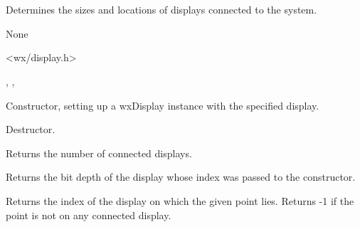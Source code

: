 \section{}\label{wxdisplay}

Determines the sizes and locations of displays connected to the system.


None


<wx/display.h>


, , 


\label{wxdisplayconstr}


Constructor, setting up a wxDisplay instance with the specified display.





Destructor.

\label{wxdisplaygetcount}


Returns the number of connected displays.

\label{wxdisplaygetdepth}


Returns the bit depth of the display whose index was passed to the constructor.

\label{wxdisplaygetfrompoint}


Returns the index of the display on which the given point lies.  Returns -1 if
the point is not on any connected display.

